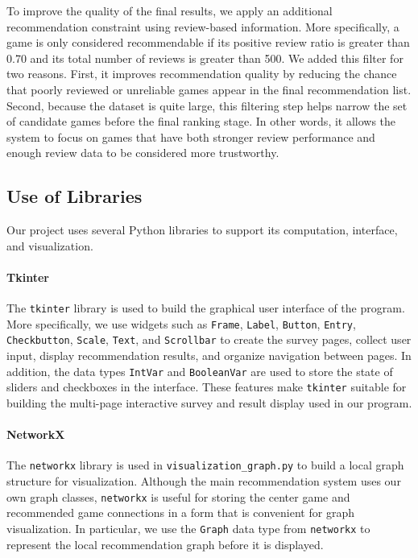 \documentclass[fontsize=11pt]{article}
\begin{document}
To improve the quality of the final results, we apply an additional recommendation constraint using review-based information. More specifically, a game is only considered recommendable if its positive review ratio is greater than 0.70 and its total number of reviews is greater than 500. We added this filter for two reasons. First, it improves recommendation quality by reducing the chance that poorly reviewed or unreliable games appear in the final recommendation list. Second, because the dataset is quite large, this filtering step helps narrow the set of candidate games before the final ranking stage. In other words, it allows the system to focus on games that have both stronger review performance and enough review data to be considered more trustworthy.

\subsection{Use of Libraries}

Our project uses several Python libraries to support its computation, interface, and visualization.

\paragraph{Tkinter}
The \texttt{tkinter} library is used to build the graphical user interface of the program. More specifically, we use widgets such as \texttt{Frame}, \texttt{Label}, \texttt{Button}, \texttt{Entry}, \texttt{Checkbutton}, \texttt{Scale}, \texttt{Text}, and \texttt{Scrollbar} to create the survey pages, collect user input, display recommendation results, and organize navigation between pages. In addition, the data types \texttt{IntVar} and \texttt{BooleanVar} are used to store the state of sliders and checkboxes in the interface. These features make \texttt{tkinter} suitable for building the multi-page interactive survey and result display used in our program.

\paragraph{NetworkX}
The \texttt{networkx} library is used in \texttt{visualization\_graph.py} to build a local graph structure for visualization. Although the main recommendation system uses our own graph classes, \texttt{networkx} is useful for storing the center game and recommended game connections in a form that is convenient for graph visualization. In particular, we use the \texttt{Graph} data type from \texttt{networkx} to represent the local recommendation graph before it is displayed.
\end{document}
